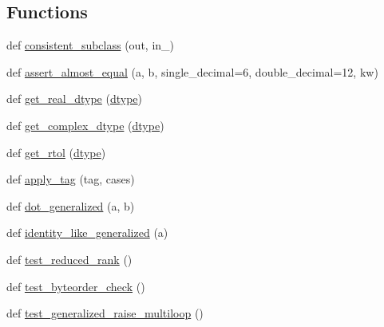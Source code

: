 \subsection*{Functions}
\begin{DoxyCompactItemize}
\item 
def \hyperlink{namespacenumpy_1_1linalg_1_1tests_1_1test__linalg_a2c1ac47ea03aaec91b7515ae8226851c}{consistent\+\_\+subclass} (out, in\+\_\+)
\item 
def \hyperlink{namespacenumpy_1_1linalg_1_1tests_1_1test__linalg_a0d7cb85bb1980e12bb6e3351af612040}{assert\+\_\+almost\+\_\+equal} (a, b, single\+\_\+decimal=6, double\+\_\+decimal=12, kw)
\item 
def \hyperlink{namespacenumpy_1_1linalg_1_1tests_1_1test__linalg_a8e8abbb60a285b785ba85752c02ef2ff}{get\+\_\+real\+\_\+dtype} (\hyperlink{namespacenumpy_1_1linalg_1_1tests_1_1test__linalg_a1063ea74fa35b7244592f8a89b8a71a2}{dtype})
\item 
def \hyperlink{namespacenumpy_1_1linalg_1_1tests_1_1test__linalg_a174b73210f06d22f41ba468ec23e6dbb}{get\+\_\+complex\+\_\+dtype} (\hyperlink{namespacenumpy_1_1linalg_1_1tests_1_1test__linalg_a1063ea74fa35b7244592f8a89b8a71a2}{dtype})
\item 
def \hyperlink{namespacenumpy_1_1linalg_1_1tests_1_1test__linalg_af65d02633f9a46e483b4ea678d7582ab}{get\+\_\+rtol} (\hyperlink{namespacenumpy_1_1linalg_1_1tests_1_1test__linalg_a1063ea74fa35b7244592f8a89b8a71a2}{dtype})
\item 
def \hyperlink{namespacenumpy_1_1linalg_1_1tests_1_1test__linalg_a71bf0e4b7271f01106d15d26dadef245}{apply\+\_\+tag} (tag, cases)
\item 
def \hyperlink{namespacenumpy_1_1linalg_1_1tests_1_1test__linalg_ac19224dad97e6a39a879ba330b7da6ee}{dot\+\_\+generalized} (a, b)
\item 
def \hyperlink{namespacenumpy_1_1linalg_1_1tests_1_1test__linalg_a55fde0f5fe3c06434e18b7e157c2ad40}{identity\+\_\+like\+\_\+generalized} (a)
\item 
def \hyperlink{namespacenumpy_1_1linalg_1_1tests_1_1test__linalg_a93b43f8208f628f42c0c243380434594}{test\+\_\+reduced\+\_\+rank} ()
\item 
def \hyperlink{namespacenumpy_1_1linalg_1_1tests_1_1test__linalg_a30a92b6e82e9f0c4693ddfee74b82a4b}{test\+\_\+byteorder\+\_\+check} ()
\item 
def \hyperlink{namespacenumpy_1_1linalg_1_1tests_1_1test__linalg_a4b7074845e6fba2654577a83f83d0e0c}{test\+\_\+generalized\+\_\+raise\+\_\+multiloop} ()

\end{DoxyCompactItemize}
